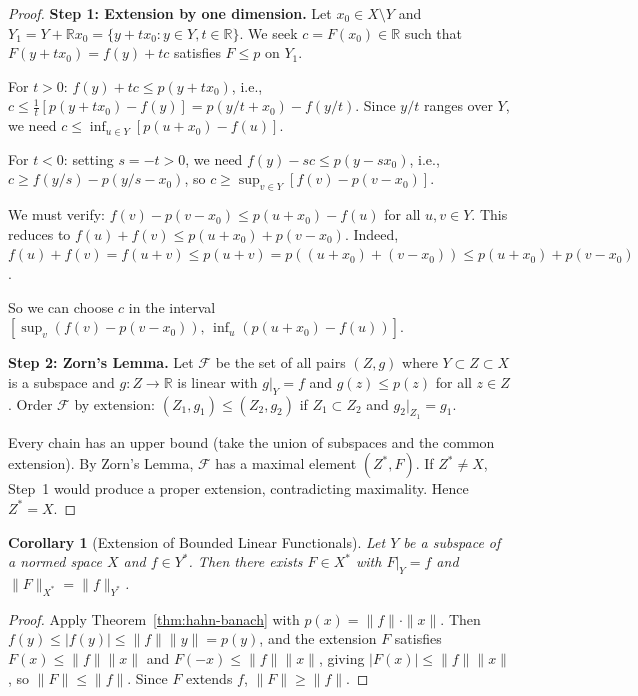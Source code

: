 \documentclass[11pt,a4paper]{article}
\theoremstyle{definition}
\theoremstyle{plain}
\newtheorem{corollary}[theorem]{Corollary}
\theoremstyle{remark}
\newcommand{\R}{\mathbb{R}}
\begin{document}
\begin{proof}
\textbf{Step 1: Extension by one dimension.}
Let $x_0 \in X \setminus Y$ and $Y_1 = Y + \R x_0 = \{y + t x_0 : y \in Y, t \in \R\}$.
We seek $c = F(x_0) \in \R$ such that $F(y + t x_0) = f(y) + tc$ satisfies
$F \leq p$ on $Y_1$.

For $t > 0$: $f(y) + tc \leq p(y + tx_0)$, i.e.,
$c \leq \frac{1}{t}[p(y + tx_0) - f(y)] = p(y/t + x_0) - f(y/t)$.
Since $y/t$ ranges over $Y$, we need
$c \leq \inf_{u \in Y}[p(u + x_0) - f(u)]$.

For $t < 0$: setting $s = -t > 0$, we need $f(y) - sc \leq p(y - sx_0)$,
i.e., $c \geq f(y/s) - p(y/s - x_0)$, so
$c \geq \sup_{v \in Y}[f(v) - p(v - x_0)]$.

We must verify:
$f(v) - p(v - x_0) \leq p(u + x_0) - f(u)$ for all $u, v \in Y$.
This reduces to $f(u) + f(v) \leq p(u + x_0) + p(v - x_0)$.
Indeed, $f(u) + f(v) = f(u + v) \leq p(u + v) = p((u + x_0) + (v - x_0))
\leq p(u + x_0) + p(v - x_0)$.

So we can choose $c$ in the interval
$[\sup_v(f(v) - p(v - x_0)),\, \inf_u(p(u + x_0) - f(u))]$.

\textbf{Step 2: Zorn's Lemma.}
Let $\mathcal{F}$ be the set of all pairs $(Z, g)$ where $Y \subset Z \subset X$
is a subspace and $g \colon Z \to \R$ is linear with $g|_Y = f$ and
$g(z) \leq p(z)$ for all $z \in Z$. Order $\mathcal{F}$ by extension:
$(Z_1, g_1) \leq (Z_2, g_2)$ if $Z_1 \subset Z_2$ and $g_2|_{Z_1} = g_1$.

Every chain has an upper bound (take the union of subspaces and the common
extension). By Zorn's Lemma, $\mathcal{F}$ has a maximal element $(Z^*, F)$.
If $Z^* \neq X$, Step~1 would produce a proper extension, contradicting
maximality. Hence $Z^* = X$.
\end{proof}

\begin{corollary}[Extension of Bounded Linear Functionals]\label{cor:hahn-banach-normed}
Let $Y$ be a subspace of a normed space $X$ and $f \in Y^*$. Then there exists
$F \in X^*$ with $F|_Y = f$ and $\|F\|_{X^*} = \|f\|_{Y^*}$.
\end{corollary}

\begin{proof}
Apply Theorem~\ref{thm:hahn-banach} with $p(x) = \|f\| \cdot \|x\|$.
Then $f(y) \leq |f(y)| \leq \|f\| \|y\| = p(y)$, and the extension $F$
satisfies $F(x) \leq \|f\| \|x\|$ and $F(-x) \leq \|f\| \|x\|$,
giving $|F(x)| \leq \|f\| \|x\|$, so $\|F\| \leq \|f\|$.
Since $F$ extends $f$, $\|F\| \geq \|f\|$.
\end{proof}
\end{document}
